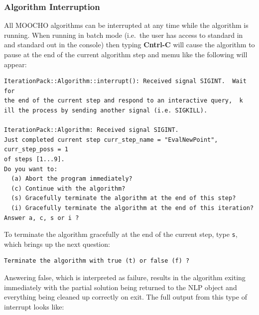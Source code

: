 \documentclass[pdf,ps2pdf,11pt]{SANDreport}
\begin{document}
%
\subsubsection{Algorithm Interruption}
\label{moocho:sec:interruption}
%

All MOOCHO algorithms can be interrupted at any time while the algorithm is
running.  When running in batch mode (i.e.\ the user has access to standard in
and standard out in the console) then typing {}\textbf{Cntrl-C} will cause the
algorithm to pause at the end of the current algorithm step and memu like the
following will appear:
%
{\small\begin{verbatim}
IterationPack::Algorithm::interrupt(): Received signal SIGINT.  Wait for
the end of the current step and respond to an interactive query,  k
ill the process by sending another signal (i.e. SIGKILL).

IterationPack::Algorithm: Received signal SIGINT.
Just completed current step curr_step_name = "EvalNewPoint", curr_step_poss = 1
of steps [1...9].
Do you want to:
  (a) Abort the program immediately?
  (c) Continue with the algorithm?
  (s) Gracefully terminate the algorithm at the end of this step?
  (i) Gracefully terminate the algorithm at the end of this iteration?
Answer a, c, s or i ?
\end{verbatim}}
%
To terminate the algorithm gracefully at the end of the current step, type
{}\texttt{s}, which brings up the next question:
%
{\small\begin{verbatim}
Terminate the algorithm with true (t) or false (f) ?
\end{verbatim}}
%
Answering false, which is interpreted as failure, results in the algorithm
exiting immediately with the partial solution being returned to the NLP object
and everything being cleaned up correctly on exit.  The full output from this
type of interrupt looks like:
%
\end{document}
